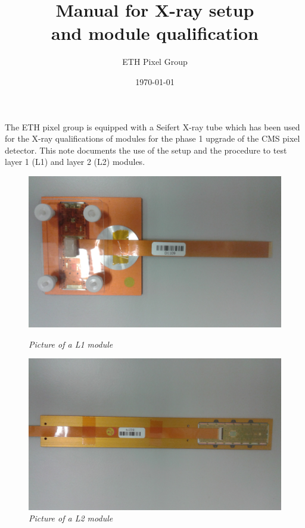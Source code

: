 \documentclass[a4paper,12pt,twoside]{article}
\date{}
\begin{document}
\title{\textbf{Manual for X-ray setup \\ and module qualification}}
\date{\today}
\author{ETH Pixel Group}
\maketitle

The ETH pixel group is equipped with a Seifert X-ray tube which has been used for the X-ray qualifications of modules for the phase 1 upgrade of the CMS pixel detector. This note documents the use of the setup and the procedure to test layer 1 (L1) and layer 2 (L2) modules.

\begin{figure} [h!]
\centering
\begin{minipage}{.49\textwidth}
  \centering
  \includegraphics[width=\textwidth]{./Figures/L1.jpg}
  \caption{\em Picture of a L1 module}
  \label{L1}
\end{minipage}%
\hspace{1mm}
\begin{minipage}{.49\textwidth}
  \centering
  \includegraphics[width=\textwidth]{./Figures/L2.jpg}
  \caption{\em Picture of a L2 module}
  \label{L2}
\end{minipage}
\end{figure}
\end{document}
